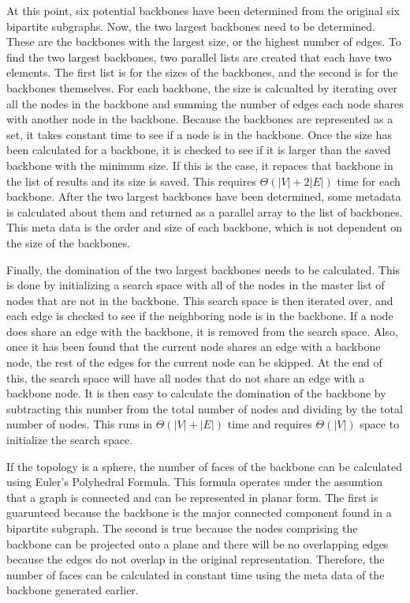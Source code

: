 \documentclass{article}
\begin{document}
        \par
        At this point, six potential backbones have been determined from the original six bipartite subgraphs. Now, the two largest backbones need to be determined. These are the backbones with the largest size, or the highest number of edges. To find the two largest backbones, two parallel lists are created that each have two elements. The first list is for the sizes of the backbones, and the second is for the backbones themselves. For each backbone, the size is calcualted by iterating over all the nodes in the backbone and summing the number of edges each node shares with another node in the backbone. Because the backbones are represented as a set, it takes constant time to see if a node is in the backbone. Once the size has been calculated for a backbone, it is checked to see if it is larger than the saved backbone with the minimum size. If this is the case, it repaces that backbone in the list of results and its size is saved. This requires $\Theta(|V| + 2|E|)$ time for each backbone. After the two largest backbones have been determined, some metadata is calculated about them and returned as a parallel array to the list of backbones. This meta data is the order and size of each backbone, which is not dependent on the size of the backbones.
        \par
        Finally, the domination of the two largest backbones needs to be calculated. This is done by initializing a search space with all of the nodes in the master list of nodes that are not in the backbone. This search space is then iterated over, and each edge is checked to see if the neighboring node is in the backbone. If a node does share an edge with the backbone, it is removed from the search space. Also, once it has been found that the current node shares an edge with a backbone node, the rest of the edges for the current node can be skipped. At the end of this, the search space will have all nodes that do not share an edge with a backbone node. It is then easy to calculate the domination of the backbone by subtracting this number from the total number of nodes and dividing by the total number of nodes. This runs in $\Theta(|V| + |E|)$ time and requires $\Theta(|V|)$ space to initialize the search space.
        \par
        If the topology is a sphere, the number of faces of the backbone can be calculated using Euler's Polyhedral Formula. This formula operates under the assumtion that a graph is connected and can be represented in planar form. The first is guarunteed because the backbone is the major connected component found in a bipartite subgraph. The second is true because the nodes comprising the backbone can be projected onto a plane and there will be no overlapping edges because the edges do not overlap in the original representation. Therefore, the number of faces can be calculated in constant time using the meta data of the backbone generated earlier.
\end{document}

